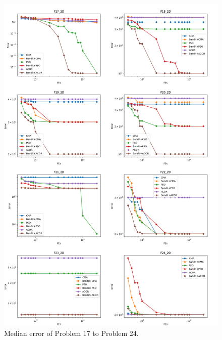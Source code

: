 \begin{figure}
\centering
\includegraphics[width=\textwidth]{Median_F17_F24}
\caption{Median error of Problem 17 to Problem 24.}\label{fig:Median_F17_F24}
\end{figure}

